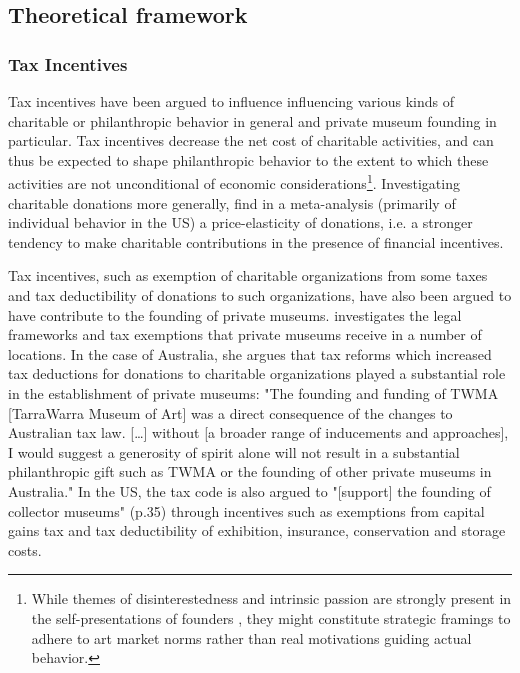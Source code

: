 \documentclass[11pt]{article}
\begin{document}
\subsection*{Theoretical framework}




\subsubsection*{Tax Incentives}





Tax incentives have been argued to influence influencing various kinds of charitable or philanthropic behavior in general and private museum founding in particular.
Tax incentives decrease the net cost of charitable activities, and can thus be expected to shape philanthropic behavior to the extent to which these activities are not unconditional of economic considerations\footnote{While themes of disinterestedness and intrinsic passion are strongly present in the self-presentations of founders \parencite{Bechtler_Imhof_2018_future,Duron_2020_rebaudengo}, they might constitute strategic framings to adhere to art market norms \parencite{Velthuis_2007_talking} rather than real motivations guiding actual behavior.}. 
Investigating charitable donations more generally, \textcite{Peloza_Steel_2005_elasticities} find in a meta-analysis (primarily of individual behavior in the US) a price-elasticity of donations, i.e. a stronger tendency to make charitable contributions in the presence of financial incentives.






Tax incentives, such as exemption of charitable organizations from some taxes and tax deductibility of donations to such organizations, have also been argued to have contribute to the founding of private museums.
\textcite{Walker_2019_collector} investigates the legal frameworks and tax exemptions that private museums receive in a number of locations.
In the case of Australia, she argues that tax reforms which increased tax deductions for donations to charitable organizations played a substantial role in the establishment of private museums: "The founding and funding of TWMA [TarraWarra Museum of Art] was a direct consequence of the changes to Australian tax law. [\ldots{}] without [a broader range of inducements and approaches], I would suggest a generosity of spirit alone will not result in a substantial philanthropic gift such as TWMA or the founding of other private museums in Australia."
In the US, the tax code is also argued to "[support] the founding of collector museums" (p.35) through incentives such as exemptions from capital gains tax and tax deductibility of exhibition, insurance, conservation and storage costs.
\end{document}
